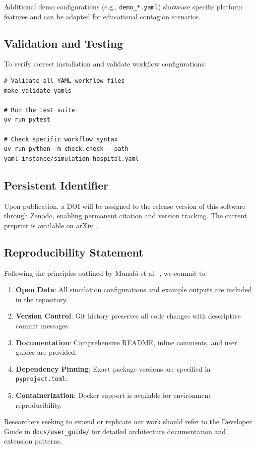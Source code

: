 Additional demo configurations (e.g., \texttt{demo\_*.yaml}) showcase specific platform features and can be adapted for educational contagion scenarios.

\subsection{Validation and Testing}

To verify correct installation and validate workflow configurations:

\begin{verbatim}
# Validate all YAML workflow files
make validate-yamls

# Run the test suite
uv run pytest

# Check specific workflow syntax
uv run python -m check.check --path yaml_instance/simulation_hospital.yaml
\end{verbatim}

\subsection{Persistent Identifier}

Upon publication, a DOI will be assigned to the release version of this software through Zenodo, enabling permanent citation and version tracking. The current preprint is available on arXiv~\cite{qian2023chatdev}.

\subsection{Reproducibility Statement}

Following the principles outlined by Munaf{\`o} et al.~\cite{munafo2017manifesto}, we commit to:
\begin{enumerate}
    \item \textbf{Open Data}: All simulation configurations and example outputs are included in the repository.
    \item \textbf{Version Control}: Git history preserves all code changes with descriptive commit messages.
    \item \textbf{Documentation}: Comprehensive README, inline comments, and user guides are provided.
    \item \textbf{Dependency Pinning}: Exact package versions are specified in \texttt{pyproject.toml}.
    \item \textbf{Containerization}: Docker support is available for environment reproducibility.
\end{enumerate}

Researchers seeking to extend or replicate our work should refer to the Developer Guide in \texttt{docs/user\_guide/} for detailed architecture documentation and extension patterns.
